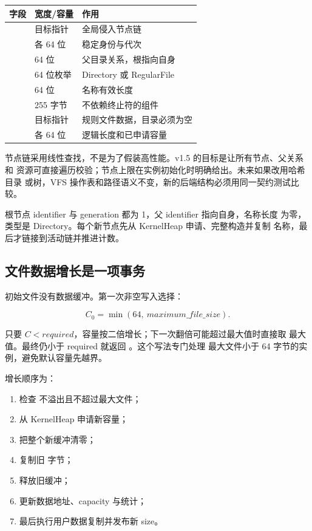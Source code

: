 \begin{longtable}{L{0.30\textwidth}L{0.18\textwidth}L{0.40\textwidth}}
\toprule
字段 & 宽度/容量 & 作用\\
\midrule
{} & 目标指针 & 全局侵入节点链\\
 & 各 64 位 & 稳定身份与代次\\
 & 64 位 & 父目录关系，根指向自身\\
 & 64 位枚举 & Directory 或 RegularFile\\
 & 64 位 & 名称有效长度\\
 & 255 字节 & 不依赖终止符的组件\\
 & 目标指针 & 规则文件数据，目录必须为空\\
 & 各 64 位 & 逻辑长度和已申请容量\\
\bottomrule
\end{longtable}

节点链采用线性查找，不是为了假装高性能。v1.5 的目标是让所有节点、父关系和
资源可直接遍历校验；节点上限在实例初始化时明确给出。未来如果改用哈希目录
或树，VFS 操作表和路径语义不变，新的后端结构必须用同一契约测试比较。

根节点 identifier 与 generation 都为 1，父 identifier 指向自身，名称长度
为零，类型是 Directory。每个新节点先从 KernelHeap 申请、完整构造并复制
名称，最后才链接到活动链并推进计数。

\subsection{文件数据增长是一项事务}

初始文件没有数据缓冲。第一次非空写入选择：

\[
  C_0 = \min(64,\ maximum\_file\_size).
\]

只要 \(C < required\)，容量按二倍增长；下一次翻倍可能超过最大值时直接取
最大值。最终仍小于 required 就返回 。这个写法专门处理
最大文件小于 64 字节的实例，避免默认容量先越界。

增长顺序为：

\begin{enumerate}
  \item 检查  不溢出且不超过最大文件；
  \item 从 KernelHeap 申请新容量；
  \item 把整个新缓冲清零；
  \item 复制旧  字节；
  \item 释放旧缓冲；
  \item 更新数据地址、capacity 与统计；
  \item 最后执行用户数据复制并发布新 size。
\end{enumerate}

